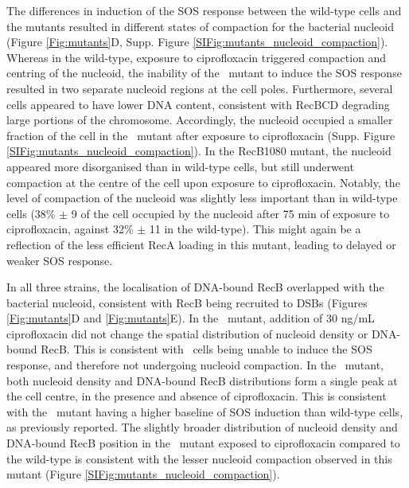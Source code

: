 The differences in induction of the SOS response between the wild-type cells and the mutants resulted in different states of compaction for the bacterial nucleoid (Figure \ref{Fig:mutants}D, Supp. Figure \ref{SIFig:mutants_nucleoid_compaction}). Whereas in the wild-type, exposure to ciprofloxacin triggered compaction and centring of the nucleoid, the inability of the \dreca\ mutant to induce the SOS response resulted in two separate nucleoid regions at the cell poles. Furthermore, several cells appeared to have lower DNA content, consistent with RecBCD degrading large portions of the chromosome. Accordingly, the nucleoid occupied a smaller fraction of the cell in the \dreca\ mutant after exposure to ciprofloxacin (Supp. Figure \ref{SIFig:mutants_nucleoid_compaction}). In the RecB1080 mutant, the nucleoid appeared more disorganised than in wild-type cells, but still underwent compaction at the centre of the cell upon exposure to ciprofloxacin. Notably, the level of compaction of the nucleoid was slightly less important than in wild-type cells (38\% $\pm$ 9 of the cell occupied by the nucleoid after 75 min of exposure to ciprofloxacin, against 32\% $\pm$ 11 in the wild-type). This might again be a reflection of the less efficient RecA loading in this mutant, leading to delayed or weaker SOS response.

In all three strains, the localisation of DNA-bound RecB overlapped with the bacterial nucleoid, consistent with RecB being recruited to DSBs (Figures \ref{Fig:mutants}D and \ref{Fig:mutants}E). In the \dreca\ mutant, addition of 30 ng/mL ciprofloxacin did not change the spatial distribution of nucleoid density or DNA-bound RecB. This is consistent with \dreca\ cells being unable to induce the SOS response, and therefore not undergoing nucleoid compaction. In the \teneighty\ mutant, both nucleoid density and DNA-bound RecB distributions form a single peak at the cell centre, in the presence and absence of ciprofloxacin. This is consistent with the \teneighty\ mutant having a higher baseline of SOS induction than wild-type cells, as previously reported.\cite{Lepore2023} The slightly broader distribution of nucleoid density and DNA-bound RecB position in the \teneighty\ mutant exposed to ciprofloxacin compared to the wild-type is consistent with the lesser nucleoid compaction observed in this mutant (Figure \ref{SIFig:mutants_nucleoid_compaction}).


